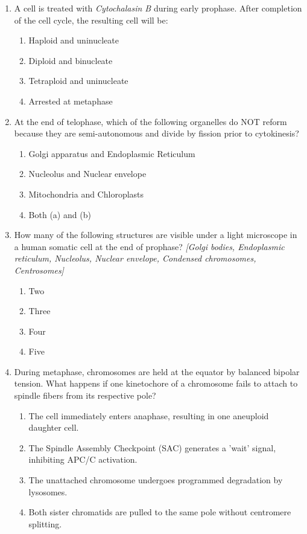 \documentclass[11pt,a4paper]{article}
\begin{document}
\begin{enumerate}[label=\textbf{\arabic*.}, leftmargin=*]
\item A cell is treated with \textit{Cytochalasin B} during early prophase. After completion of the cell cycle, the resulting cell will be:
\begin{enumerate}[label=(\alph*)]
    \item Haploid and uninucleate
    \item Diploid and binucleate
    \item Tetraploid and uninucleate
    \item Arrested at metaphase
\end{enumerate}

\item At the end of telophase, which of the following organelles do NOT reform because they are semi-autonomous and divide by fission prior to cytokinesis?
\begin{enumerate}[label=(\alph*)]
    \item Golgi apparatus and Endoplasmic Reticulum
    \item Nucleolus and Nuclear envelope
    \item Mitochondria and Chloroplasts
    \item Both (a) and (b)
\end{enumerate}

\item How many of the following structures are visible under a light microscope in a human somatic cell at the end of prophase?
\textit{[Golgi bodies, Endoplasmic reticulum, Nucleolus, Nuclear envelope, Condensed chromosomes, Centrosomes]}
\begin{enumerate}[label=(\alph*)]
    \item Two
    \item Three
    \item Four
    \item Five
\end{enumerate}

\item During metaphase, chromosomes are held at the equator by balanced bipolar tension. What happens if one kinetochore of a chromosome fails to attach to spindle fibers from its respective pole?
\begin{enumerate}[label=(\alph*)]
    \item The cell immediately enters anaphase, resulting in one aneuploid daughter cell.
    \item The Spindle Assembly Checkpoint (SAC) generates a 'wait' signal, inhibiting APC/C activation.
    \item The unattached chromosome undergoes programmed degradation by lysosomes.
    \item Both sister chromatids are pulled to the same pole without centromere splitting.
\end{enumerate}


\end{enumerate}
\end{document}
